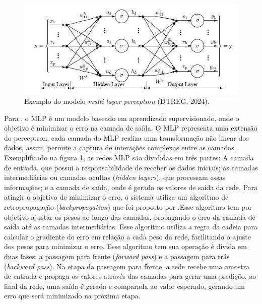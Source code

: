\begin{figure}[h]
\centering\includegraphics[scale=0.75]{images/mlp.jpg}
\caption{Exemplo do modelo \textit{multi layer perceptron} (DTREG, 2024).}
\label{fig: mlp}
\end{figure}


Para , o MLP é um modelo baseado em aprendizado supervisionado, onde o objetivo é minimizar o erro na camada de saída. O MLP representa uma extensão do perceptron, cada camada do MLP realiza uma transformação não linear dos dados, assim, permite a captura de interações complexas entre as camadas. Exemplificado na figura \ref{fig: mlp}, as redes MLP são divididas em três partes: A camada de entrada, que possui a responsabilidade de receber os dados iniciais; as camadas intermediárias ou camadas ocultas (\textit{hidden layers}), que processam essas informações; e a camada de saída, onde é gerado os valores de saída da rede. Para atingir o objetivo de minimizar o erro, o sistema utiliza um algoritmo de retropropagação (\textit{backpropagation}) que foi proposto por .Esse algoritmo tem por objetivo ajustar os pesos ao longo das camadas, propagando o erro da camada de saída até as camadas intermediárias. Esse algoritmo utiliza a regra da cadeia para calcular o gradiente do erro em relação a cada peso da rede, facilitando o ajuste dos pesos para minimizar o erro. Esse algoritmo tem sua operação é divida em duas fases: a passagem para frente (\textit{forward pass}) e a passagem para trás (\textit{backward pass}). Na etapa da passagem para frente, a rede recebe uma amostra de entrada e propaga os valores através das camadas para gerar uma predição, ao final da rede, uma saída é gerada e comparada ao valor esperado, gerando um erro que será minimizado na próxima etapa. 

